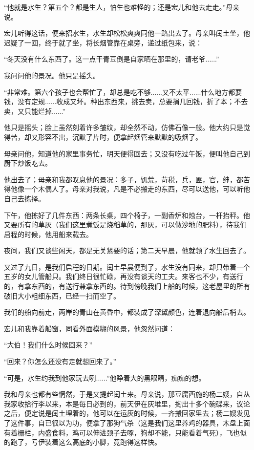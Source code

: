 \documentclass[12pt,UTF8]{ctexbook}
\begin{document}
“他就是水生？第五个？都是生人，怕生也难怪的；还是宏儿和他去走走。”母亲说。

宏儿听得这话，便来招水生，水生却松松爽爽同他一路出去了。母亲叫闰土坐，他迟疑了一回，终于就了坐，将长烟管靠在桌旁，递过纸包来，说：

“冬天没有什么东西了。这一点干青豆倒是自家晒在那里的，请老爷......”

我问问他的景况。他只是摇头。

“非常难。第六个孩子也会帮忙了，却总是吃不够......又不太平......什么地方都要钱，没有定规......收成又坏。种出东西来，挑去卖，总要捐几回钱，折了本；不去卖，又只能烂掉......”

他只是摇头；脸上虽然刻着许多皱纹，却全然不动，仿佛石像一般。他大约只是觉得苦，却又形容不出，沉默了片时，便拿起烟管来默默的吸烟了。

母亲问他，知道他的家里事务忙，明天便得回去；又没有吃过午饭，便叫他自己到厨下炒饭吃去。

他出去了；母亲和我都叹息他的景况：多子，饥荒，苛税，兵，匪，官，绅，都苦得他像一个木偶人了。母亲对我说，凡是不必搬走的东西，尽可以送他，可以听他自己去拣择。

下午，他拣好了几件东西：两条长桌，四个椅子，一副香炉和烛台，一杆抬秤。他又要所有的草灰（我们这里煮饭是烧稻草的，那灰，可以做沙地的肥料），待我们启程的时候，他用船来载去。

夜间，我们又谈些闲天，都是无关紧要的话；第二天早晨，他就领了水生回去了。

又过了九日，是我们启程的日期。闰土早晨便到了，水生没有同来，却只带着一个五岁的女儿管船只。我们终日很忙碌，再没有谈天的工夫。来客也不少，有送行的，有拿东西的，有送行兼拿东西的。待到傍晚我们上船的时候，这老屋里的所有破旧大小粗细东西，已经一扫而空了。

我们的船向前走，两岸的青山在黄昏中，都装成了深黛颜色，连着退向船后梢去。

宏儿和我靠着船窗，同看外面模糊的风景，他忽然问道：

“大伯！我们什么时候回来？”

“回来？你怎么还没有走就想回来了。”

“可是，水生约我到他家玩去咧......”他睁着大的黑眼睛，痴痴的想。

我和母亲也都有些惘然，于是又提起闰土来。母亲说，那豆腐西施的杨二嫂，自从我家收拾行李以来，本是每日必到的，前天伊在灰堆里，掏出十多个碗碟来，议论之后，便定说是闰土埋着的，他可以在运灰的时候，一齐搬回家里去；杨二嫂发见了这件事，自已很以为功，便拿了那狗气杀（这是我们这里养鸡的器具，木盘上面有着栅栏，内盛食料，鸡可以伸进颈子去啄，狗却不能，只能看着气死），飞也似的跑了，亏伊装着这么高底的小脚，竟跑得这样快。
\end{document}
